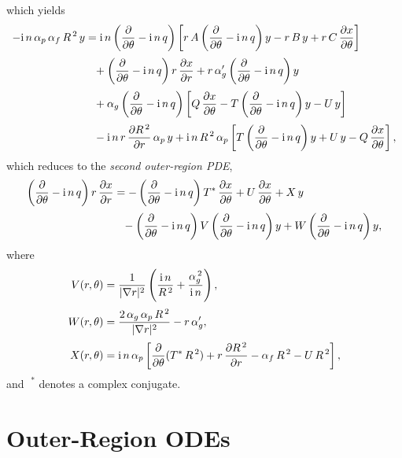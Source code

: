 \documentclass[12pt,prb,aps]{revtex4-1}
\begin{document}
which yields
\begin{align}
-{\rm i}\,n\,\alpha_p\,\alpha_f\,R^{\,2}\,y&={\rm i}\,n\left(\frac{\partial}{\partial\theta}-{\rm i}\,n\,q\right)\left[r\,A\left(\frac{\partial}{\partial \theta}-{\rm i}\,n\,q\right)y-r\,B\,y+r\,C\,\frac{\partial x}{\partial\theta}\right]\nonumber\\[0.5ex]&\phantom= +\left(\frac{\partial}{\partial\theta}-{\rm i}\,n\,q\right)r\,\frac{\partial x}{\partial r}  +r\,\alpha_g'\left(\frac{\partial}{\partial\theta}-{\rm i}\,n\,q\right)y \nonumber\\[0.5ex]
&\phantom{=}+ \alpha_g\left(\frac{\partial}{\partial\theta}-{\rm i}\,n\,q\right)\left[Q\,\frac{\partial x}{\partial\theta}
-T\left(\frac{\partial}{\partial\theta}-{\rm i}\,n\,q\right)y-U\,y\right]\nonumber\\[0.5ex]&\phantom{=}
-{\rm i}\,n\,r\,\frac{\partial R^{\,2}}{\partial r}\,\alpha_p\,y+{\rm i}\,n\,R^{\,2}\,\alpha_p \left[T\left(\frac{\partial}{\partial\theta}-{\rm i}\,n\,q\right)y + U\,y -Q\,\frac{\partial x}{\partial\theta}\right],
\end{align}
which reduces to the {\em second outer-region PDE},\cite{connor}
\begin{align}\label{esecond}
\left(\frac{\partial}{\partial\theta}-{\rm i}\,n\,q\right)r\,\frac{\partial x}{\partial r} &= -\left(\frac{\partial}{\partial\theta}-{\rm i}\,n\,q\right)T^\ast\,\frac{\partial x}{\partial \theta} + U\,\frac{\partial x}{\partial\theta}+X\,y\nonumber\\[0.5ex]&\phantom{=} -\left(\frac{\partial}{\partial\theta}-{\rm i}\,n\,q\right)V\left(\frac{\partial}{\partial\theta}-{\rm i}\,n\,q\right)y + W\left(\frac{\partial}{\partial\theta}-{\rm i}\,n\,q\right)y,
\end{align}
where
\begin{align}
V(r,\theta)&= \frac{1}{|\nabla r|^2}\left(\frac{{\rm i}\,n}{R^{\,2}}+\frac{\alpha_g^{\,2}}{{\rm i}\,n}\right),\label{ev}\\[0.5ex]
W(r,\theta)&= \frac{2\,\alpha_g\,\alpha_p\,R^{\,2}}{|\nabla r|^2} -r\,\alpha_g',\label{ew}\\[0.5ex]
X(r,\theta)&= {\rm i}\,n\,\alpha_p\left[\frac{\partial}{\partial \theta}(T^\ast\,R^{\,2})+r\,\frac{\partial R^{\,2}}{\partial r}-\alpha_f\,R^{\,2}-U\,R^{\,2}\right],\label{ex}
\end{align}
and $\phantom{!}^\ast$ denotes a complex conjugate.

\section{Outer-Region ODEs}\label{sode}
\end{document}
